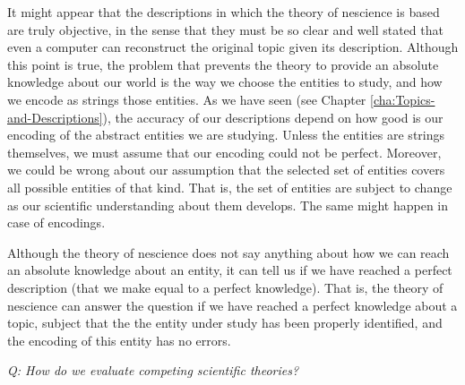 It might appear that the descriptions in which the theory of nescience is based are truly objective, in the sense that they must be so clear and well stated that even a computer can reconstruct the original topic given its description. Although this point is true, the problem that prevents the theory to provide an absolute knowledge about our world is the way we choose the entities to study, and how we encode as strings those entities. As we have seen (see Chapter \ref{cha:Topics-and-Descriptions}), the accuracy of our descriptions depend on how good is our encoding of the abstract entities we are studying. Unless the entities are strings themselves, we must assume that our encoding could not be perfect. Moreover, we could be wrong about our assumption that the selected set of entities covers all possible entities of that kind. That is, the set of entities are subject to change as our scientific understanding about them develops. {\color{red} The same might happen in case of encodings.}

Although the theory of nescience does not say anything about how we can reach an absolute knowledge about an entity, it can tell us if we have reached a perfect description (that we make equal to a perfect knowledge). That is, the theory of nescience can answer the question if we have reached a perfect knowledge about a topic, subject that the the entity under study has been properly identified, and the encoding of this entity has no errors.

\vskip 0.5cm


\emph{Q: How do we evaluate competing scientific theories?}

